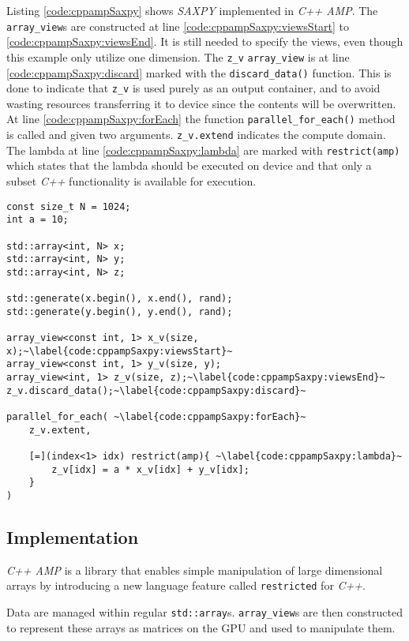 Listing \ref{code:cppampSaxpy} shows \textit{SAXPY} implemented in \textit{C++ AMP}. The \texttt{array\_view}s are constructed at line \ref{code:cppampSaxpy:viewsStart} to \ref{code:cppampSaxpy:viewsEnd}. It is still needed to specify the views, even though this example only utilize one dimension. The \texttt{z\_v} \texttt{array\_view} is at line \ref{code:cppampSaxpy:discard} marked with the \texttt{discard\_data()} function. This is done to indicate that \texttt{z\_v} is used purely as an output container, and to avoid wasting resources transferring it to device since the contents will be overwritten.
At line \ref{code:cppampSaxpy:forEach} the function \texttt{parallel\_for\_each()} method is called and given two arguments. \texttt{z\_v.extend} indicates the compute domain. The lambda at line \ref{code:cppampSaxpy:lambda} are marked with \texttt{restrict(amp)} which states that the lambda should be executed on device and that only a subset \textit{C++} functionality is available for execution.
\begin{lstlisting}[caption={\textit{C++ AMP} \textit{SAXPY} example.}, label={code:cppampSaxpy}]
const size_t N = 1024;
int a = 10;

std::array<int, N> x;
std::array<int, N> y;
std::array<int, N> z;

std::generate(x.begin(), x.end(), rand);
std::generate(y.begin(), y.end(), rand);

array_view<const int, 1> x_v(size, x);~\label{code:cppampSaxpy:viewsStart}~
array_view<const int, 1> y_v(size, y);
array_view<int, 1> z_v(size, z);~\label{code:cppampSaxpy:viewsEnd}~
z_v.discard_data();~\label{code:cppampSaxpy:discard}~

parallel_for_each( ~\label{code:cppampSaxpy:forEach}~
    z_v.extent,

    [=](index<1> idx) restrict(amp){ ~\label{code:cppampSaxpy:lambda}~
        z_v[idx] = a * x_v[idx] + y_v[idx];
    }
)
\end{lstlisting}

\subsection{Implementation}

\textit{C++ AMP} is a library that enables simple manipulation of large dimensional arrays by introducing a new language feature called \texttt{restricted} for \textit{C++}. 

Data are managed within regular \texttt{std::array}s. \texttt{array\_view}s are then constructed to represent these arrays as matrices on the GPU and used to manipulate them.

